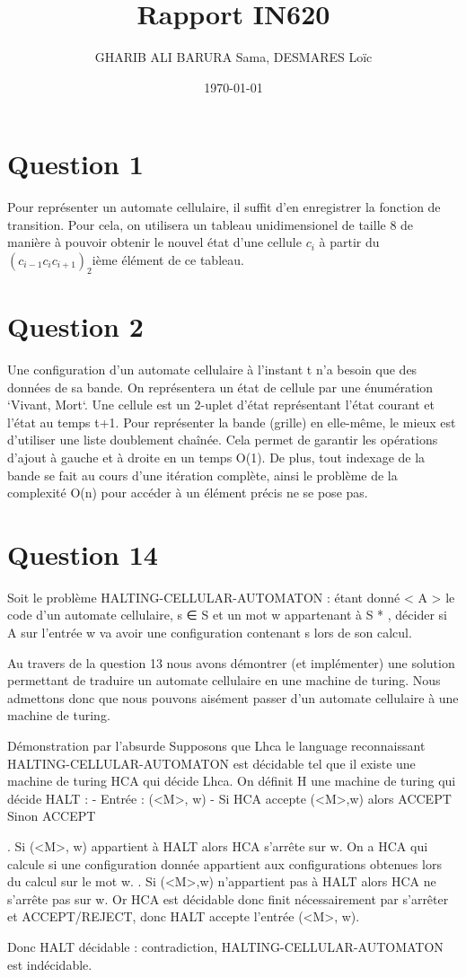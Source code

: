 \documentclass{article}
\title{Rapport IN620}
\date{\today}
\author{GHARIB ALI BARURA Sama, DESMARES Loïc}
\begin{document}
  \maketitle

  \newpage

  \section{Question 1}
    Pour représenter un automate cellulaire, il suffit d'en enregistrer la fonction de
  transition. Pour cela, on utilisera un tableau unidimensionel de taille 8 de manière
  à pouvoir obtenir le nouvel état d'une cellule \(c_i\) à partir du
  \((c_{i-1} c_i c_{i+1})_2\)ième élément de ce tableau.

  \section{Question 2}
      Une configuration d'un automate cellulaire à l'instant t n'a besoin que des données
  de sa bande. On représentera un état de cellule par une énumération `Vivant, Mort`.
  Une cellule est un 2-uplet d'état représentant l'état courant et l'état au temps t+1.
  Pour représenter la bande (grille) en elle-même, le mieux est d'utiliser une liste doublement
  chaînée. Cela permet de garantir les opérations d'ajout à gauche et à droite en un temps
  O(1). De plus, tout indexage de la bande se fait au cours d'une itération complète, ainsi
  le problème de la complexité O(n) pour accéder à un élément précis ne se pose pas.

  \section{Question 14}
      Soit le problème HALTING-CELLULAR-AUTOMATON : étant donné < A > le code
  d’un automate cellulaire, s ∈ S et un mot w appartenant à S * , décider si A sur l’entrée w va avoir une configuration
  contenant s lors de son calcul.

  Au travers de la question 13 nous avons démontrer (et implémenter) une solution permettant de traduire un 
  automate cellulaire en une machine de turing.
  Nous admettons donc que nous pouvons aisément passer d'un automate cellulaire à une machine de turing.

  Démonstration par l'absurde
  Supposons que Lhca le language reconnaissant HALTING-CELLULAR-AUTOMATON est décidable tel que il existe 
  une machine de turing HCA qui décide Lhca.
  On définit H une machine de turing qui décide HALT :
  - Entrée : (<M>, w)
  - Si HCA accepte (<M>,w) alors ACCEPT
    Sinon ACCEPT

  . Si (<M>, w) appartient à HALT alors HCA s'arrête sur w. On a HCA qui calcule si une configuration donnée 
  appartient aux configurations obtenues lors du calcul sur le mot w.
  . Si (<M>,w) n'appartient pas à HALT alors HCA ne s'arrête pas sur w. Or HCA est décidable donc finit 
  nécessairement par s'arrêter et ACCEPT/REJECT, donc HALT accepte l'entrée (<M>, w).

  Donc HALT décidable : contradiction, HALTING-CELLULAR-AUTOMATON est indécidable.
  
\end{document}
